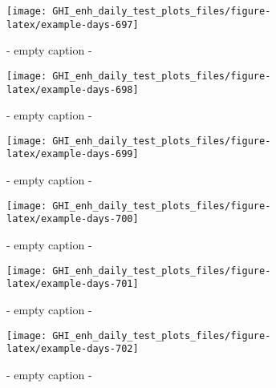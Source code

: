 \documentclass[
  10pt,
  a4paper,oneside]{article}
\begin{document}
\begin{figure}[H]

{\centering \texttt{[image: GHI\_enh\_daily\_test\_plots\_files/figure-latex/example-days-697]} 

}

\caption{ - empty caption - }\label{fig:example-days-697}
\end{figure}

\begin{figure}[H]

{\centering \texttt{[image: GHI\_enh\_daily\_test\_plots\_files/figure-latex/example-days-698]} 

}

\caption{ - empty caption - }\label{fig:example-days-698}
\end{figure}

\begin{figure}[H]

{\centering \texttt{[image: GHI\_enh\_daily\_test\_plots\_files/figure-latex/example-days-699]} 

}

\caption{ - empty caption - }\label{fig:example-days-699}
\end{figure}

\begin{figure}[H]

{\centering \texttt{[image: GHI\_enh\_daily\_test\_plots\_files/figure-latex/example-days-700]} 

}

\caption{ - empty caption - }\label{fig:example-days-700}
\end{figure}

\begin{figure}[H]

{\centering \texttt{[image: GHI\_enh\_daily\_test\_plots\_files/figure-latex/example-days-701]} 

}

\caption{ - empty caption - }\label{fig:example-days-701}
\end{figure}

\begin{figure}[H]

{\centering \texttt{[image: GHI\_enh\_daily\_test\_plots\_files/figure-latex/example-days-702]} 

}

\caption{ - empty caption - }\label{fig:example-days-702}
\end{figure}
\end{document}
